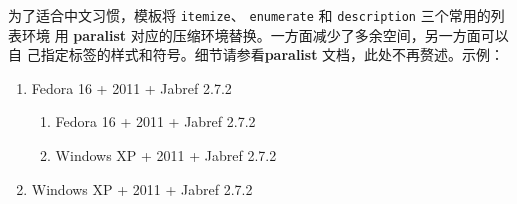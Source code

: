 为了适合中文习惯，模板将 \texttt{itemize}、 \texttt{enumerate} 和
\texttt{description} 三个常用的列表环境
用 \textbf{paralist} 对应的压缩环境替换。一方面减少了多余空间，另一方面可以自
己指定标签的样式和符号。细节请参看\textbf{paralist} 文档，此处不再赘述。示例：
\begin{enumerate}
\item Fedora 16 + \TeXLive{} 2011 + Jabref 2.7.2
  \begin{enumerate}
    \item Fedora 16 + \TeXLive{} 2011 + Jabref 2.7.2
    \item Windows XP + \TeXLive{} 2011 + Jabref 2.7.2
  \end{enumerate}
\item Windows XP + \TeXLive{} 2011 + Jabref 2.7.2
\end{enumerate}
